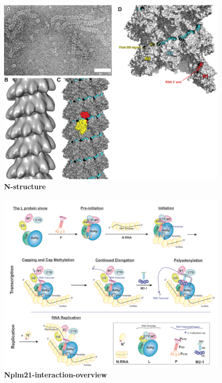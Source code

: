 \begin{figure}
    \centering
    \includegraphics[width=1\linewidth]{04. Introduction//Figs/08. N-structure.jpeg}
    \caption[N-structure]{\textbf{N-structure} }
    \label{fig:N-structure}
\end{figure}

\begin{figure}
    \centering
    \includegraphics[width=1\linewidth]{04. Introduction//Figs/09. N_p_l_m21-interaction-overview.png}  
    \caption[Nplm21-interaction-overview]{\textbf{Nplm21-interaction-overview} }
    \label{fig:Nplm21-interaction-overview}
\end{figure}

